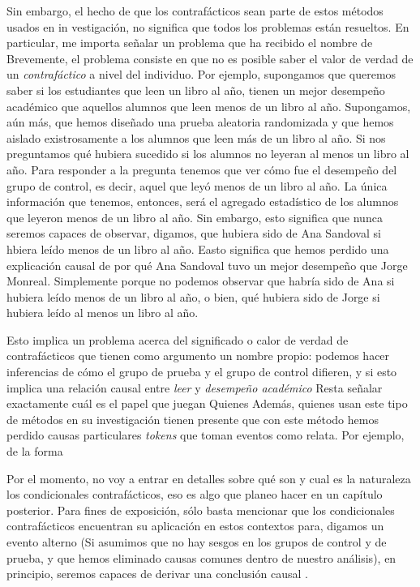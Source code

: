 Sin embargo, el hecho de que los contrafácticos sean parte de estos
métodos usados en in vestigación, no significa que todos los
problemas están resueltos. En particular, me importa señalar un
problema que ha recibido el nombre de  Brevemente, el problema consiste en que no
es posible saber el valor de verdad de un \emph{contrafáctico} a
nivel del individuo. Por ejemplo, supongamos que queremos saber si
los estudiantes que leen un libro al año, tienen un mejor desempeño
académico que aquellos alumnos que leen menos de un libro al año.
Supongamos, aún más, que hemos diseñado una prueba aleatoria
randomizada y que hemos aislado existrosamente a los alumnos que
leen más de un libro al año. Si nos preguntamos qué hubiera sucedido
si los alumnos no leyeran al menos un libro al año. Para responder a
la pregunta  tenemos que ver cómo
fue el desempeño del grupo de control, es decir, aquel que leyó
menos de un libro al año. La única información que tenemos,
entonces, será el agregado estadístico de los alumnos que leyeron
menos de un libro al año. Sin embargo, esto significa que nunca
seremos capaces de observar, digamos, que hubiera sido de Ana
Sandoval si hbiera leído menos de un libro al año. Easto significa
que hemos perdido una explicación causal de por qué Ana Sandoval
tuvo un mejor desempeño que Jorge Monreal. Simplemente porque no
podemos observar que habría sido de Ana si hubiera leído menos de un
libro al año, o bien, qué hubiera sido de Jorge si hubiera leído al
menos un libro al año.

Esto implica un problema acerca del significado o calor de verdad de contrafácticos que tienen como argumento un nombre propio: podemos hacer inferencias de cómo el grupo de prueba y el grupo de control difieren, y si esto implica una relación causal entre \emph{leer} y \emph{desempeño académico}
Resta señalar exactamente cuál es el papel que juegan  Quienes  Además, quienes usan este tipo de métodos en su investigación tienen presente que con este método hemos perdido causas particulares \emph{tokens} que toman eventos como relata. Por ejemplo,  de la forma

Por el momento, no voy a entrar en detalles sobre qué son y cual es la naturaleza los condicionales contrafácticos, eso es algo que planeo hacer en un capítulo posterior. Para fines de exposición, sólo basta mencionar que los condicionales contrafácticos encuentran su aplicación en estos contextos para, digamos  un evento alterno (Si asumimos que no hay sesgos en los grupos de control y de prueba, y que hemos eliminado causas comunes dentro de nuestro análisis), en principio, seremos capaces de derivar una conclusión causal \cite{Pearl2016, Otsuka2023}.

